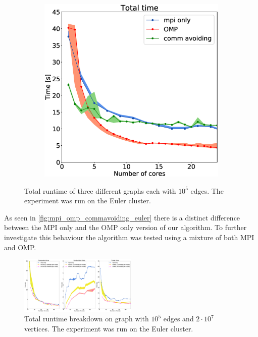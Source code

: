 \begin{figure}
\begin{subfigure}[c]{0.15\textwidth}
\label{fig:mpi_omp_commavoiding_euler_2}
\end{subfigure}
\begin{subfigure}[c]{0.15\textwidth}
\includegraphics[width=\textwidth]{plots/20000our_impl}
\label{fig:mpi_omp_commavoiding_euler_3}
\end{subfigure}
\caption{Total runtime of three different graphs each with $10^{5}$ edges. The experiment was run on the Euler cluster.}
\label{fig:mpi_omp_commavoiding_euler}
\end{figure}

As seen in \autoref{fig:mpi_omp_commavoiding_euler} there is a distinct difference between the MPI only and the OMP only version of our algorithm. To further investigate this behaviour the algorithm was tested using a mixture of both MPI and OMP.

\begin{figure}
\includegraphics[width=0.5\textwidth]{plots/20000mpi_mixtures_with_everything}
\caption{Total runtime breakdown on graph with $10^{5}$ edges and $2\cdot10^{7}$ vertices. The experiment was run on the Euler cluster.}
\label{fig:mixed_euler}
\end{figure}

